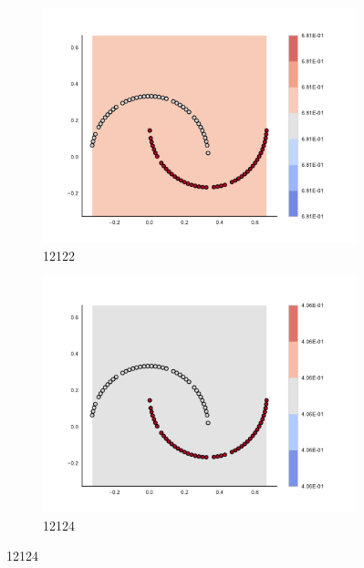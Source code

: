 \begin{figure}[h]
\begin{subfigure}[b]{0.09\textwidth}
    \includegraphics[clip, trim=2.35cm 1.75cm 4.5cm 0cm,width=\textwidth]{img/convergence/12122.pdf}
    \caption{12122}
    \label{fig:convergence_12122}
\end{subfigure}
%
\begin{subfigure}[b]{0.09\textwidth}
    \includegraphics[clip, trim=2.35cm 1.75cm 4.5cm 0cm,width=\textwidth]{img/convergence/12124.pdf}
    \caption{12124}
    \label{fig:convergence_12124}
\end{subfigure}
%
        \end{figure}
